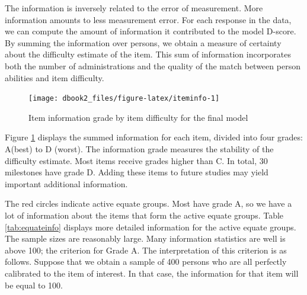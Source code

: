 \documentclass[
]{book}
\begin{document}
The information is inversely related to the error of measurement. More information amounts to less measurement error. For each response in the data, we can compute the amount of information it contributed to the model D-score. By summing the information over persons, we obtain a measure of certainty about the difficulty estimate of the item. This sum of information incorporates both the number of administrations and the quality of the match between person abilities and item difficulty.

\begin{figure}

{\centering \texttt{[image: dbook2\_files/figure-latex/iteminfo-1]} 

}

\caption{Item information grade by item difficulty for the final model}\label{fig:iteminfo}
\end{figure}



Figure \ref{fig:iteminfo} displays the summed information for each item, divided into four grades: A(best) to D (worst). The information grade measures the stability of the difficulty estimate. Most items receive grades higher than C. In total, 30 milestones have grade D. Adding these items to future studies may yield important additional information.

The red circles indicate active equate groups. Most have grade A, so we have a lot of information about the items that form the active equate groups. Table \ref{tab:equateinfo} displays more detailed information for the active equate groups. The sample sizes are reasonably large. Many information statistics are well is above 100; the criterion for Grade A. The interpretation of this criterion is as follows. Suppose that we obtain a sample of 400 persons who are all perfectly calibrated to the item of interest. In that case, the information for that item will be equal to 100.
\end{document}
